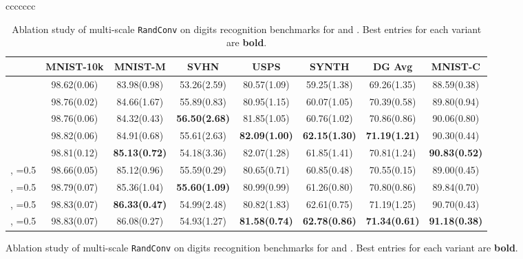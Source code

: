 \documentclass{article} \usepackage{iclr2021_conference,times}
\newcommand{\RandConv}{\texttt{RandConv}}
\begin{document}
\begin{figure}[t]
\begin{center}
\begin{adjustbox}{max width=\textwidth}
\begin{tabular}{ccccccc}
\begin{table}[htp]
	\caption{Ablation study of multi-scale {\RandConv} on digits recognition benchmarks for  and . Best entries for each variant are \textbf{bold}.}
	\label{digits-scale}
	\begin{tabular}{l|c|ccccc|c}
		\toprule
		& MNIST-10k    & MNIST-M    & SVHN        & USPS        & SYNTH       & DG Avg         & MNIST-C     \\
		\midrule
		       & 98.62\tiny(0.06)          & 83.98\tiny(0.98)          & 53.26\tiny(2.59)          & 80.57\tiny(1.09)          & 59.25\tiny(1.38)          & 69.26\tiny(1.35)          & 88.59\tiny(0.38)          \\
		  & 98.76\tiny(0.02)          & 84.66\tiny(1.67)          & 55.89\tiny(0.83)          & 80.95\tiny(1.15)          & 60.07\tiny(1.05)          & 70.39\tiny(0.58)          & 89.80\tiny(0.94)          \\
		  & 98.76\tiny(0.06)          & 84.32\tiny(0.43)          & \textbf{56.50\tiny(2.68)} & 81.85\tiny(1.05)    & 60.76\tiny(1.02)          & 70.86\tiny(0.86)          & 90.06\tiny(0.80)          \\
		  & 98.82\tiny(0.06)    	& 84.91\tiny(0.68)         & 55.61\tiny(2.63)   & \textbf{82.09\tiny(1.00)} & \textbf{62.15\tiny(1.30)}   & \textbf{71.19\tiny(1.21)}        & 90.30\tiny(0.44)   \\
		 &  98.81\tiny(0.12) & \textbf{85.13\tiny(0.72)}          & 54.18\tiny(3.36)          & 82.07\tiny(1.28)          & 61.85\tiny(1.41)          & 70.81\tiny(1.24)          & \textbf{90.83\tiny(0.52)}   \\
		\midrule
		\tiny, =0.5   & 98.66\tiny(0.05) & 85.12\tiny(0.96)          & 55.59\tiny(0.29)          & 80.65\tiny(0.71)          & 60.85\tiny(0.48)          & 70.55\tiny(0.15)          & 89.00\tiny(0.45)          \\
		\tiny, =0.5 & 98.79\tiny(0.07) & 85.36\tiny(1.04)          & \textbf{55.60\tiny(1.09)} & 80.99\tiny(0.99)          & 61.26\tiny(0.80)          & 70.80\tiny(0.86)          & 89.84\tiny(0.70)          \\
		\tiny, =0.5 & 98.83\tiny(0.07) & \textbf{86.33\tiny(0.47)} & 54.99\tiny(2.48)          & 80.82\tiny(1.83)          & 62.61\tiny(0.75)          & 71.19\tiny(1.25)          & 90.70\tiny(0.43)          \\
		\tiny, =0.5 & 98.83\tiny(0.07) & 86.08\tiny(0.27)          & 54.93\tiny(1.27)          & \textbf{81.58\tiny(0.74)} & \textbf{62.78\tiny(0.86)} & \textbf{71.34\tiny(0.61)} & \textbf{91.18\tiny(0.38)} \\

\end{tabular}
\end{table}
\end{tabular}
\end{adjustbox}
\end{center}
\end{figure}
\end{document}
